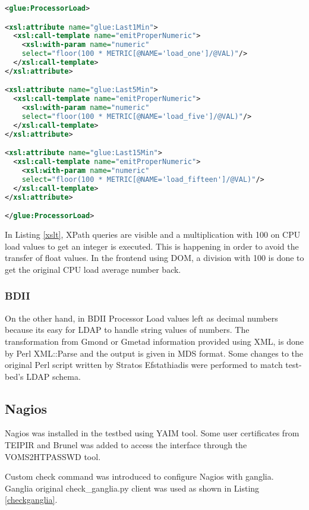 \begin{lstlisting}[language=XML,caption=WSRF XSLT for Ganglia Information Provider,label=xslt]
<glue:ProcessorLoad>

<xsl:attribute name="glue:Last1Min">
  <xsl:call-template name="emitProperNumeric">
    <xsl:with-param name="numeric" 
    select="floor(100 * METRIC[@NAME='load_one']/@VAL)"/>
  </xsl:call-template>
</xsl:attribute>

<xsl:attribute name="glue:Last5Min">
  <xsl:call-template name="emitProperNumeric">
    <xsl:with-param name="numeric" 
    select="floor(100 * METRIC[@NAME='load_five']/@VAL)"/>
  </xsl:call-template>
</xsl:attribute>

<xsl:attribute name="glue:Last15Min">
  <xsl:call-template name="emitProperNumeric">
    <xsl:with-param name="numeric" 
    select="floor(100 * METRIC[@NAME='load_fifteen']/@VAL)"/>
  </xsl:call-template>
</xsl:attribute>

</glue:ProcessorLoad>
\end{lstlisting}

In Listing \ref{xslt}, XPath queries are visible and a multiplication with 100 on CPU load values to get an integer is executed. This is happening in order to avoid the transfer of float values. In the frontend using DOM, a division with 100 is done to get the original CPU load average number back.

\subsubsection{BDII}

On the other hand, in BDII Processor Load values left as decimal numbers because its easy for LDAP to handle string values of numbers. The transformation from Gmond or Gmetad information provided using XML, is done by Perl XML::Parse and the output is given in MDS format. Some changes to the original Perl script written by Stratos Efstathiadis \cite{stratos_efstathiadis} were performed to match test-bed's LDAP schema.

\subsection{Nagios}

Nagios was installed in the testbed using YAIM tool. Some user certificates from TEIPIR and Brunel was added to access the interface through the VOMS2HTPASSWD tool.

Custom check command was introduced to configure Nagios with ganglia. Ganglia original check\_ganglia.py client was used as shown in Listing \ref{checkganglia}.

